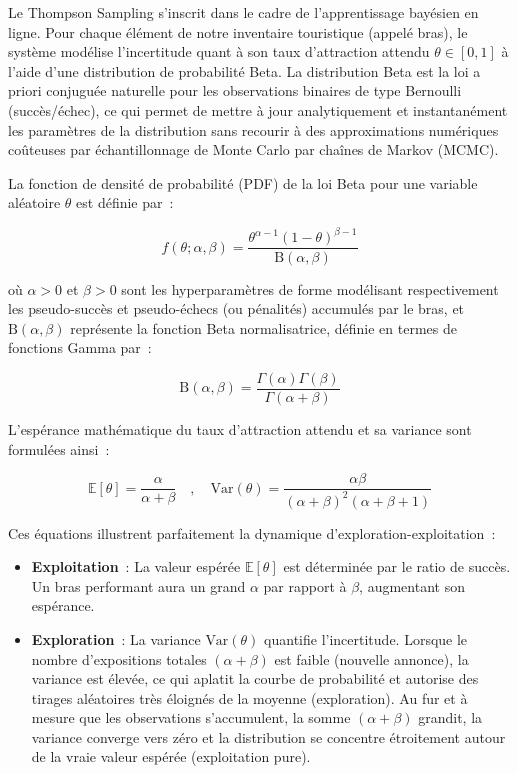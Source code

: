Le Thompson Sampling s'inscrit dans le cadre de l'apprentissage bayésien en ligne. Pour chaque élément de notre inventaire touristique (appelé \og{}bras\fg{}), le système modélise l'incertitude quant à son taux d'attraction attendu $\theta \in [0, 1]$ à l'aide d'une distribution de probabilité Beta. La distribution Beta est la loi a priori conjuguée naturelle pour les observations binaires de type Bernoulli (succès/échec), ce qui permet de mettre à jour analytiquement et instantanément les paramètres de la distribution sans recourir à des approximations numériques coûteuses par échantillonnage de Monte Carlo par chaînes de Markov (MCMC).

La fonction de densité de probabilité (PDF) de la loi Beta pour une variable aléatoire $\theta$ est définie par~:

\begin{equation}
    f(\theta; \alpha, \beta) = \frac{\theta^{\alpha - 1} (1 - \theta)^{\beta - 1}}{\mathrm{B}(\alpha, \beta)}
    \label{eq:beta_pdf}
\end{equation}

où $\alpha > 0$ et $\beta > 0$ sont les hyperparamètres de forme modélisant respectivement les pseudo-succès et pseudo-échecs (ou pénalités) accumulés par le bras, et $\mathrm{B}(\alpha, \beta)$ représente la fonction Beta normalisatrice, définie en termes de fonctions Gamma par~:

\begin{equation}
    \mathrm{B}(\alpha, \beta) = \frac{\Gamma(\alpha)\Gamma(\beta)}{\Gamma(\alpha + \beta)}
\end{equation}

L'espérance mathématique du taux d'attraction attendu et sa variance sont formulées ainsi~:

\begin{equation}
    \mathbb{E}[\theta] = \frac{\alpha}{\alpha + \beta} \quad , \quad \text{Var}(\theta) = \frac{\alpha\beta}{(\alpha + \beta)^2(\alpha + \beta + 1)}
    \label{eq:beta_moments}
\end{equation}

Ces équations illustrent parfaitement la dynamique d'exploration-exploitation~:
\begin{itemize}
    \item \textbf{Exploitation}~: La valeur espérée $\mathbb{E}[\theta]$ est déterminée par le ratio de succès. Un bras performant aura un grand $\alpha$ par rapport à $\beta$, augmentant son espérance.
    \item \textbf{Exploration}~: La variance $\text{Var}(\theta)$ quantifie l'incertitude. Lorsque le nombre d'expositions totales $(\alpha + \beta)$ est faible (nouvelle annonce), la variance est élevée, ce qui aplatit la courbe de probabilité et autorise des tirages aléatoires très éloignés de la moyenne (exploration). Au fur et à mesure que les observations s'accumulent, la somme $(\alpha + \beta)$ grandit, la variance converge vers zéro et la distribution se concentre étroitement autour de la vraie valeur espérée (exploitation pure).
\end{itemize}

